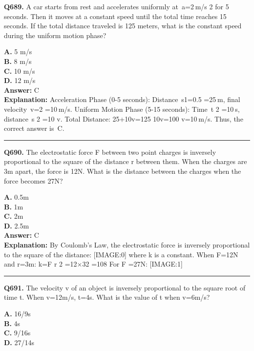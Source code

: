 \documentclass[12pt]{article}
\begin{document}
\noindent
\textbf{Q689.} A car starts from rest and accelerates uniformly at a=2 m/s
2
for 5 seconds. Then it moves at a constant speed until the total time reaches 15 seconds. If the total distance traveled is 125 meters, what is the constant speed during the uniform motion phase?



\textbf{A.} 5 m/s \\
\textbf{B.} 8 m/s \\
\textbf{C.} 10 m/s \\
\textbf{D.} 12 m/s \\

\textbf{Answer:} C \\
\textbf{Explanation:} Acceleration Phase (0-5 seconds):
Distance s1=0.5
=25 m, final velocity v=2
=10 m/s.
Uniform Motion Phase (5-15 seconds):
Time t
2
=10 s, distance s
2
=10
\cdot 
v.
Total Distance:
25+10v=125
\implies 
10v=100
\implies 
v=10 m/s.
Thus, the correct answer is C.

\hrule
\vspace{1em}


\noindent
\textbf{Q690.} The electrostatic force F between two point charges is inversely proportional to the square of the distance r between them. When the charges are 3m apart, the force is 12N. What is the distance between the charges when the force becomes 27N?



\textbf{A.} 0.5m \\
\textbf{B.} 1m \\
\textbf{C.} 2m \\
\textbf{D.} 2.5m \\

\textbf{Answer:} C \\
\textbf{Explanation:} By Coulomb's Law, the electrostatic force is inversely proportional to the square of the distance:
[IMAGE:0]
where k is a constant. When F=12N and r=3m: k=F
\cdot 
r
2
=12×32 =108
For
F
=27N:
[IMAGE:1]

\hrule
\vspace{1em}


\noindent
\textbf{Q691.} The velocity v of an object is inversely proportional to the square root of time t. When v=12m/s, t=4s. What is the value of t when v=6m/s?



\textbf{A.} 16/9s \\
\textbf{B.} 4s \\
\textbf{C.} 9/16s \\
\textbf{D.} 27/14s \\
\end{document}
